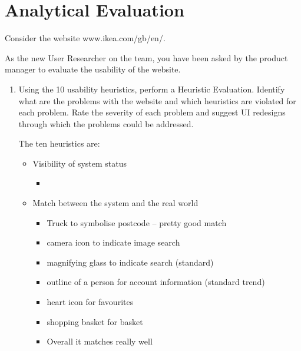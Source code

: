 \documentclass[10pt,\jkfside,a4paper]{article}
\begin{document}
\section{Analytical Evaluation}

Consider the website www.ikea.com/gb/en/.

As the new User Researcher on the team, you have been asked by the product manager to evaluate the usability of the
website.

\begin{enumerate}

\item Using the 10 usability heuristics, perform a Heuristic Evaluation. Identify what are the problems with the
website and which heuristics are violated for each problem. Rate the severity of each problem and suggest UI redesigns
through which the problems could be addressed.

The ten heuristics are:

\begin{itemize}

\item Visibility of system status

\begin{itemize}

\item

\end{itemize}

\item Match between the system and the real world

\begin{itemize}

\item Truck to symbolise postcode -- pretty good match

\item camera icon to indicate image search

\item magnifying glass to indicate search (standard)

\item outline of a person for account information (standard trend)

\item heart icon for favourites

\item shopping basket for basket

\item Overall it matches really well


\end{itemize}
\end{itemize}
\end{enumerate}
\end{document}
